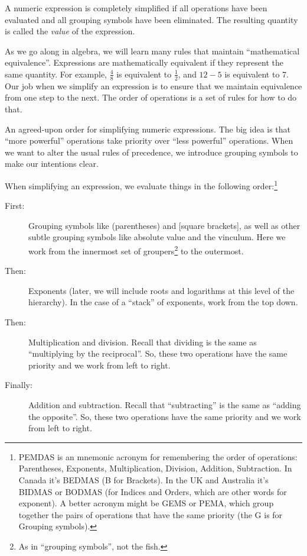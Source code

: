 \begin{boxcrit}
A numeric expression is completely simplified if all operations have been evaluated and all grouping symbols have been eliminated. The resulting quantity is called the \textit{value} of the expression.
\end{boxcrit}

As we go along in algebra, we will learn many rules that maintain ``mathematical equivalence''.  Expressions are mathematically equivalent if they represent the same quantity.  For example, $\frac{4}{8}$ is equivalent to $\frac{1}{2}$, and $12 - 5$ is equivalent to 7. Our job when we simplify an expression is to ensure that we maintain equivalence from one step to the next. The order of operations is a set of rules for how to do that.

\begin{boxdef}
An agreed-upon order for simplifying numeric expressions. The big idea is that ``more powerful'' operations take priority over ``less powerful'' operations. When we want to alter the usual rules of precedence, we introduce grouping symbols to make our intentions clear.

When simplifying an expression, we evaluate things in the following order:\footnote{PEMDAS is an mnemonic acronym for remembering the order of operations: Parentheses, Exponents, Multiplication, Division, Addition, Subtraction. In Canada it's BEDMAS (B for Brackets). In the UK and Australia it's BIDMAS or BODMAS (for Indices and Orders, which are other words for exponent). A better acronym might be GEMS or PEMA, which group together the pairs of operations that have the same priority (the G is for Grouping symbols).}

\begin{description}
\item[First:] Grouping symbols like (parentheses) and [square brackets], as well as other subtle grouping symbols like absolute value and the vinculum. Here we work from the innermost set of groupers\footnote{As in ``grouping symbols'', not the fish.} to the outermost.

\item[Then:] Exponents (later, we will include roots and logarithms at this level of the hierarchy). In the case of a ``stack'' of exponents, work from the top down.

\item[Then:] Multiplication and division. Recall that dividing is the same as ``multiplying by the reciprocal''. So, these two operations have the same priority and we work from left to right.

\item[Finally:] Addition and subtraction. Recall that ``subtracting'' is the same as ``adding the opposite''. So, these two operations have the same priority and we work from left to right.
\end{description}
\end{boxdef}

